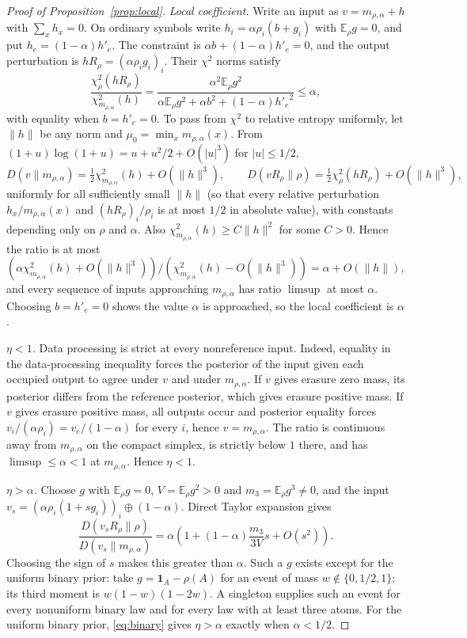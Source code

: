 \documentclass[11pt,a4paper]{article}
\numberwithin{equation}{section}
\theoremstyle{definition}
\theoremstyle{remark}
\newcommand{\KL}{D}
\newcommand{\E}{\mathbb E}
\newcommand{\one}{\mathbf 1}
\newcommand{\mra}{m_{\rho,\alpha}}
\begin{document}
\begin{proof}[Proof of Proposition~\ref{prop:local}]
\emph{Local coefficient.} Write an input as \(v=\mra+h\) with
\(\sum_xh_x=0\). On ordinary symbols write
\(h_i=\alpha\rho_i(b+g_i)\) with \(\E_\rho g=0\), and put
\(h_e=(1-\alpha)h'_e\). The constraint is \(\alpha b+(1-\alpha)h'_e=0\),
and the output perturbation is \(hR_\rho=(\alpha\rho_ig_i)_i\). Their
\(\chi^2\) norms satisfy
\begin{equation}\label{eq:local}
\frac{\chi^2_\rho(hR_\rho)}{\chi^2_{\mra}(h)}=
\frac{\alpha^2\E_\rho g^2}
{\alpha\E_\rho g^2+\alpha b^2+(1-\alpha){h'_e}^2}\le\alpha,
\end{equation}
with equality when \(b=h'_e=0\). To pass from \(\chi^2\) to relative
entropy uniformly, let \(\|h\|\) be any norm and \(\mu_0=\min_x\mra(x)\).
From \((1+u)\log(1+u)=u+u^2/2+O(|u|^3)\) for \(|u|\le1/2\),
\[
\KL(v\|\mra)=\tfrac12\chi^2_{\mra}(h)+O(\|h\|^3),\qquad
\KL(vR_\rho\|\rho)=\tfrac12\chi^2_\rho(hR_\rho)+O(\|h\|^3),
\]
uniformly for all sufficiently small \(\|h\|\) (so that every relative
perturbation \(h_x/\mra(x)\) and \((hR_\rho)_i/\rho_i\) is at most \(1/2\)
in absolute value), with constants depending only on \(\rho\) and
\(\alpha\). Also \(\chi^2_{\mra}(h)\ge C\|h\|^2\) for
some \(C>0\). Hence the ratio is at most
\((\alpha\chi^2_{\mra}(h)+O(\|h\|^3))/(\chi^2_{\mra}(h)-O(\|h\|^3))
=\alpha+O(\|h\|)\), and every sequence of inputs approaching \(\mra\) has
ratio \(\limsup\) at most \(\alpha\). Choosing \(b=h'_e=0\) shows the value
\(\alpha\) is approached, so the local coefficient is \(\alpha\).

\emph{\(\eta<1\).} Data processing is strict at every nonreference input.
Indeed, equality in the data-processing inequality forces the posterior of
the input given each occupied output to agree under \(v\) and under
\(\mra\). If \(v\) gives erasure zero mass, its posterior differs from the
reference posterior, which gives erasure positive mass. If \(v\) gives
erasure positive mass, all outputs occur and posterior equality forces
\(v_i/(\alpha\rho_i)=v_e/(1-\alpha)\) for every \(i\), hence \(v=\mra\).
The ratio is continuous away from \(\mra\) on the compact simplex, is
strictly below \(1\) there, and has \(\limsup\le\alpha<1\) at \(\mra\).
Hence \(\eta<1\).

\emph{\(\eta>\alpha\).} Choose \(g\) with \(\E_\rho g=0\),
\(V=\E_\rho g^2>0\) and \(m_3=\E_\rho g^3\ne0\), and the input
\(v_s=(\alpha\rho_i(1+sg_i))_i\oplus(1-\alpha)\). Direct Taylor expansion
gives
\begin{equation}\label{eq:cubic}
\frac{\KL(v_sR_\rho\|\rho)}{\KL(v_s\|\mra)}
=\alpha\left(1+(1-\alpha)\frac{m_3}{3V}s+O(s^2)\right).
\end{equation}
Choosing the sign of \(s\) makes this greater than \(\alpha\). Such a
\(g\) exists except for the uniform binary prior: take
\(g=\one_A-\rho(A)\) for an event of mass \(w\notin\{0,1/2,1\}\); its third
moment is \(w(1-w)(1-2w)\). A singleton supplies such an event for every
nonuniform binary law and for every law with at least three atoms. For the
uniform binary prior, \eqref{eq:binary} gives \(\eta>\alpha\) exactly when
\(\alpha<1/2\).
\end{proof}
\end{document}
